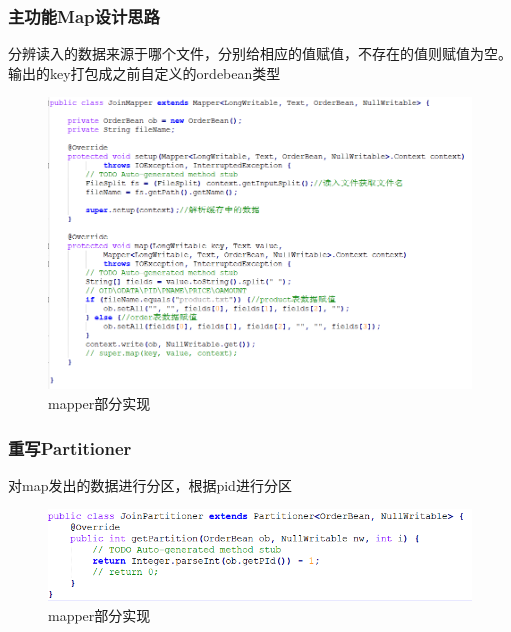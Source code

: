 \documentclass[a4paper,UTF8]{article}
\numberwithin{equation}{section}
\begin{document}
\subsubsection{主功能Map设计思路}
分辨读入的数据来源于哪个文件，分别给相应的值赋值，不存在的值则赋值为空。输出的key打包成之前自定义的ordebean类型
\begin{figure}[H]
    \centering

    \includegraphics[width = 15cm]{map1.png}

    \caption{mapper部分实现}
\end{figure}
\subsubsection{重写Partitioner}
对map发出的数据进行分区，根据pid进行分区
\begin{figure}[H]
    \centering

    \includegraphics[width = 15cm]{part1.png}

    \caption{mapper部分实现}
\end{figure}
\end{document}
